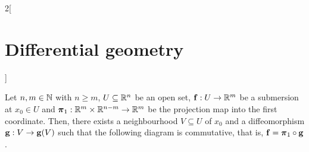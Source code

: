\documentclass[../../../main.tex]{subfiles}
\begin{document}
\begin{multicols}{2}[\section{Differential geometry}]
\begin{theorem}
\begin{center}
    \end{center}
  \end{theorem}
  \begin{theorem}
    Let $n,m\in\mathbb{N}$ with $n\geq m$, $U\subseteq\mathbb{R}^n$ be an open set, $\boldsymbol{\mathrm{f}}:U\rightarrow \mathbb{R}^m$ be a submersion at $x_0\in U$ and $\boldsymbol{\mathrm{\pi}}_1:\mathbb{R}^m\times\mathbb{R}^{n-m}\rightarrow\mathbb{R}^m$ be the projection map into the first coordinate. Then, there exists a neighbourhood $V\subseteq U$ of $x_0$ and a diffeomorphism $\boldsymbol{\mathrm{g}}:V\rightarrow \boldsymbol{\mathrm{g}}(V)$ such that the following diagram is commutative, that is, $\boldsymbol{\mathrm{f}}=\boldsymbol{\mathrm{\pi}}_1\circ\boldsymbol{\mathrm{g}}$.
    \begin{center}
      \begin{minipage}{\linewidth}
        \centering
        
      \end{minipage}
    \end{center}
  \end{theorem}

\end{multicols}
\end{document}
